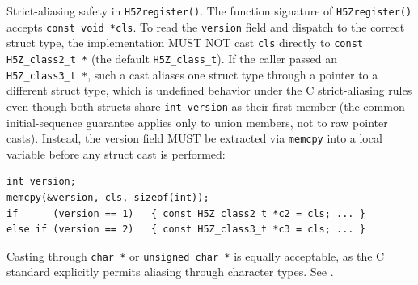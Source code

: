 \documentclass[../HDF5_RFC.tex]{subfiles}
\begin{document}
Strict-aliasing safety in \texttt{H5Zregister()}. The function signature of
\texttt{H5Zregister()} accepts \texttt{const void~*cls}. To read the \texttt{version} field and
dispatch to the correct struct type, the implementation MUST NOT cast
\texttt{cls} directly to \texttt{const H5Z\_class2\_t~*} (the default \texttt{H5Z\_class\_t}).
If the caller passed an \texttt{H5Z\_class3\_t~*}, such a cast aliases one struct
type through a pointer to a different struct type, which is undefined behavior
under the C strict-aliasing rules even though both structs share \texttt{int
version} as their first member (the common-initial-sequence guarantee applies
only to union members, not to raw pointer casts). Instead, the version field
MUST be extracted via \texttt{memcpy} into a local variable before any struct cast
is performed:

\begin{verbatim}
int version;
memcpy(&version, cls, sizeof(int));
if      (version == 1)   { const H5Z_class2_t *c2 = cls; ... }
else if (version == 2)   { const H5Z_class3_t *c3 = cls; ... }
\end{verbatim}

Casting through \texttt{char~*} or \texttt{unsigned char~*} is equally acceptable, as
the C standard explicitly permits aliasing through character types. See
.
\end{document}
